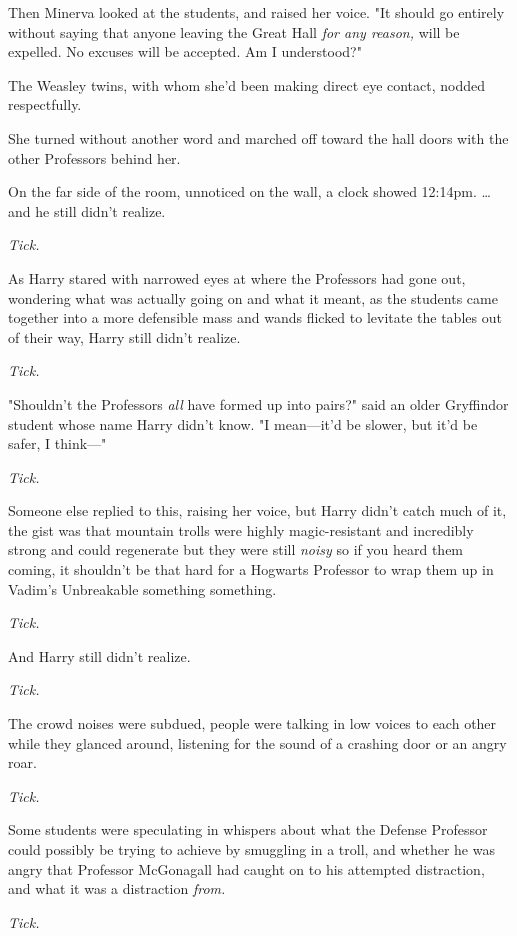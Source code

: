 Then Minerva looked at the students, and raised her voice. "It should go 
entirely without saying that anyone leaving the Great Hall \emph{for any 
reason,} will be expelled. No excuses will be accepted. Am I understood?"

The Weasley twins, with whom she'd been making direct eye contact, nodded 
respectfully.

She turned without another word and marched off toward the hall doors with the 
other Professors behind her.

On the far side of the room, unnoticed on the wall, a clock showed 12:14pm.
\sbreak
{\ldots}and he still didn't realize.

\emph{Tick.}

As Harry stared with narrowed eyes at where the Professors had gone out, 
wondering what was actually going on and what it meant, as the students came 
together into a more defensible mass and wands flicked to levitate the tables 
out of their way, Harry still didn't realize.

\emph{Tick.}

"Shouldn't the Professors \emph{all} have formed up into pairs?" said an older 
Gryffindor student whose name Harry didn't know. "I mean---it'd be slower, but 
it'd be safer, I think---"

\emph{Tick.}

Someone else replied to this, raising her voice, but Harry didn't catch much of 
it, the gist was that mountain trolls were highly magic-resistant and 
incredibly strong and could regenerate but they were still \emph{noisy} so if 
you heard them coming, it shouldn't be that hard for a Hogwarts Professor to 
wrap them up in Vadim's Unbreakable something something.

\emph{Tick.}

And Harry still didn't realize.

\emph{Tick.}

The crowd noises were subdued, people were talking in low voices to each other 
while they glanced around, listening for the sound of a crashing door or an 
angry roar.

\emph{Tick.}

Some students were speculating in whispers about what the Defense Professor 
could possibly be trying to achieve by smuggling in a troll, and whether he was 
angry that Professor McGonagall had caught on to his attempted distraction, and 
what it was a distraction \emph{from.}

\emph{Tick.}

